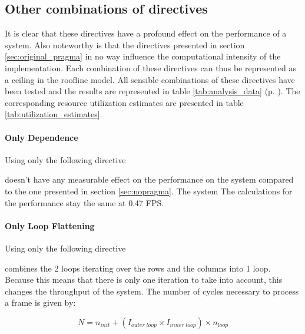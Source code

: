 


\subsection{Other combinations of directives}

It is clear that these directives have a profound effect on the performance of a system. Also noteworthy is that the directives presented in section \ref{sec:original_pragma} in no way influence the computational intensity of the implementation. Each combination of these directives can thus be represented as a ceiling in the roofline model.
All sensible combinations of these directives have been tested and the results are represented in table  
\ref{tab:analysis_data} (p. \pageref{tab:analysis_data}). The corresponding resource utilization estimates are presented in table \ref{tab:utilization_estimates}.

\paragraph{Only Dependence}
Using only the following directive


doesn't have any measurable effect on the performance on the system compared to the one presented in section \ref{sec:nopragma}. The system The calculations for the performance stay the same at 0.47 FPS.

\paragraph{Only Loop Flattening}
Using only the following directive


combines the 2 loops iterating over the rows and the columns into 1 loop. Because this means that there is only one iteration to take into account, this changes the throughput of the system. The number of cycles necessary to process a frame is given by:


\begin{equation}
N = n_{init} + (I_{outer\;loop} \times I_{inner\;loop}) \times n_{loop}
\end{equation}

